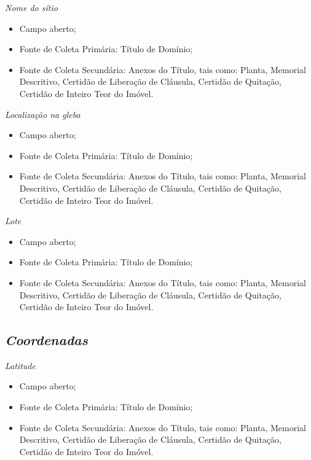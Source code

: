 \documentclass[
  letterpaper,
]{report}
\providecommand{\tightlist}{%
  \setlength{\itemsep}{0pt}\setlength{\parskip}{0pt}}\usepackage{longtable,booktabs,array}
\begin{document}
\emph{Nome do sítio}

\begin{itemize}
\tightlist
\item
  Campo aberto;
\item
  Fonte de Coleta Primária: Título de Domínio;
\item
  Fonte de Coleta Secundária: Anexos do Título, tais como: Planta,
  Memorial Descritivo, Certidão de Liberação de Cláusula, Certidão de
  Quitação, Certidão de Inteiro Teor do Imóvel.
\end{itemize}

\emph{Localização na gleba}

\begin{itemize}
\tightlist
\item
  Campo aberto;
\item
  Fonte de Coleta Primária: Título de Domínio;
\item
  Fonte de Coleta Secundária: Anexos do Título, tais como: Planta,
  Memorial Descritivo, Certidão de Liberação de Cláusula, Certidão de
  Quitação, Certidão de Inteiro Teor do Imóvel.
\end{itemize}

\emph{Lote}

\begin{itemize}
\tightlist
\item
  Campo aberto;
\item
  Fonte de Coleta Primária: Título de Domínio;
\item
  Fonte de Coleta Secundária: Anexos do Título, tais como: Planta,
  Memorial Descritivo, Certidão de Liberação de Cláusula, Certidão de
  Quitação, Certidão de Inteiro Teor do Imóvel.
\end{itemize}

\hypertarget{coordenadas}{%
\subsection{\texorpdfstring{\emph{Coordenadas}}{Coordenadas}}\label{coordenadas}}

\emph{Latitude}

\begin{itemize}
\tightlist
\item
  Campo aberto;
\item
  Fonte de Coleta Primária: Título de Domínio;
\item
  Fonte de Coleta Secundária: Anexos do Título, tais como: Planta,
  Memorial Descritivo, Certidão de Liberação de Cláusula, Certidão de
  Quitação, Certidão de Inteiro Teor do Imóvel.
\end{itemize}
\end{document}
